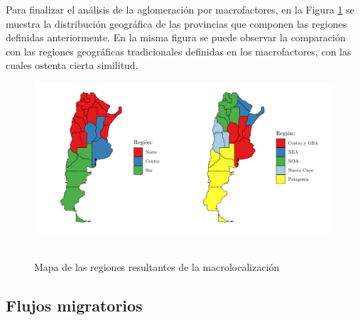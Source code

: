 \documentclass[12pt,a4paper]{article}
\begin{document}
Para finalizar el análisis de la aglomeración por macrofactores, en la Figura \ref{figure:mapa_reg} se muestra la distribución geográfica de las provincias que componen las regiones definidas anteriormente. En la misma figura se puede observar la comparación con las regiones geográficas tradicionales definidas en los macrofactores, con las cuales ostenta cierta similitud.
\begin{figure}[ht!]
\begin{center}
\caption{\\Mapa de las regiones resultantes de la macrolocalización}
\includegraphics[scale=0.7]{./graficos/mapa_regiones.pdf}
\label{figure:mapa_reg}
\end{center}
\end{figure}

\subsection{Flujos migratorios}
\end{document}
